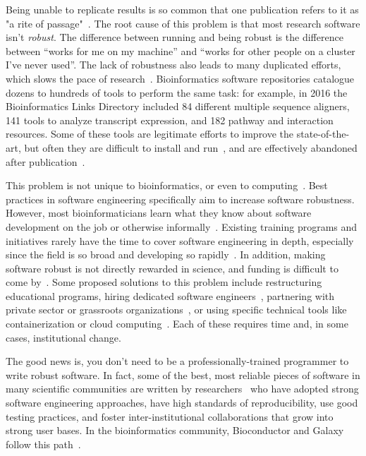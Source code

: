 \documentclass[10pt,letterpaper]{article}
\begin{document}
Being unable to
replicate results is so common that one publication refers to it as "a rite of
passage"~\cite{baker2016}. 
The root cause of this problem is that most research software
isn't \emph{robust}. The difference between running and being
robust is the difference between ``works for me on my machine'' and
``works for other people on a cluster I've never used''. The lack of
robustness also leads to many duplicated efforts,
which slows the pace of research~\cite{prabhu2011,lawlor2015}.
Bioinformatics software repositories \cite{ison2016,brazas2012} catalogue dozens to
hundreds of tools to perform the same task:
for example,
in 2016 the Bioinformatics Links Directory included 84 different multiple sequence aligners, 141 tools
to analyze transcript expression, and 182 pathway and interaction resources.
Some of these tools are legitimate efforts to improve the state-of-the-art, but
often they are difficult to install and run~\cite{stajich2002,Seemann2013}, and are effectively abandoned
after publication~\cite{nekrutenko2012}.

This problem is not unique to bioinformatics, or even to computing~\cite{baker2016}. 
Best practices in software engineering specifically aim to increase software
robustness. However, most bioinformaticians learn what they know about software development
on the job or otherwise informally~\cite{prins2015,atwood2015}.
Existing training programs and initiatives rarely have the time to cover software engineering
in depth, especially since the field is so broad and developing so rapidly~\cite{atwood2015,lawlor2015}.
In addition, making software robust is not directly rewarded
in science, and funding is difficult to come by~\cite{prins2015}. Some proposed
solutions to this problem include restructuring educational programs,
hiring dedicated software engineers~\cite{lawlor2015,sanders2008},
partnering with private sector or grassroots organizations~\cite{prins2015,ison2016},
or using specific technical tools like containerization or cloud
computing~\cite{afgan2016,howe2012}. Each of these requires time and, in some
cases, institutional change.

The good news is,
you don't need to be a professionally-trained programmer to write robust software.
In fact,
some of the best, most reliable pieces of software in many scientific
communities are written by researchers~\cite{prabhu2011,sanders2008}
who have adopted strong software
engineering approaches, have high standards of reproducibility, use good testing
practices, and foster inter-institutional collaborations that grow into strong user
bases. In the bioinformatics community, Bioconductor and Galaxy follow this
path~\cite{gentleman2004,afgan2016}.
\end{document}
